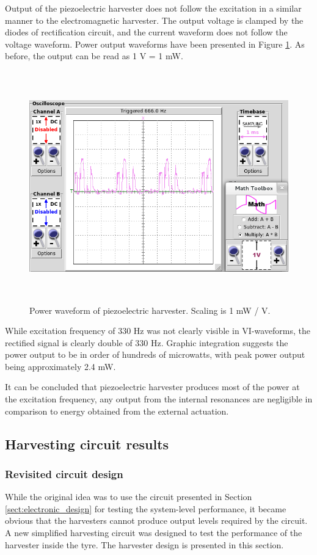 Output of the piezoelectric harvester does not follow the excitation in a similar manner to the electromagnetic harvester. The output voltage is clamped by the diodes of rectification circuit, and the current waveform does not follow the voltage waveform. Power output waveforms have been presented in Figure \ref{fig:piezo_td_power}. As before, the output can be read as 1 V = 1 mW. 

\begin{figure}[htb]
\begin{center}
\includegraphics[height=10cm]{images/own_measurement/generator_shaker/piezo_td_power_330hz_2_3.png}
\end{center}
\caption{\label{fig:piezo_td_power} Power waveform of piezoelectric harvester. Scaling is 1 mW / V.}
\end{figure}

While excitation frequency of 330 Hz was not clearly visible in VI-waveforms, the rectified signal is clearly double of 330 Hz. Graphic integration suggests the power output to be in order of hundreds of microwatts, with peak power output being approximately 2.4 mW. 

It can be concluded that piezoelectric harvester produces most of the power at the excitation frequency, any output from the internal resonances are negligible in comparison to energy obtained from the external actuation.

\subsection{Harvesting circuit results}
\subsubsection{Revisited circuit design}\label{sect:BQ25504_schematic}
While the original idea was to use the circuit presented in Section \ref{sect:electronic_design} for testing the system-level performance, it became obvious that the harvesters cannot produce output levels required by the circuit. A new simplified harvesting circuit was designed to test the performance of the harvester inside the tyre. The harvester design is presented in this section.

